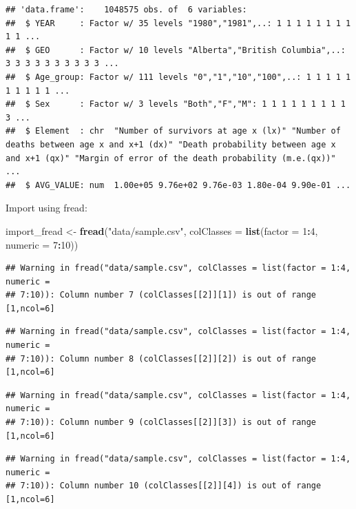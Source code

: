 \documentclass[]{book}
\newenvironment{Shaded}{\begin{snugshade}}{\end{snugshade}}
\newcommand{\DataTypeTok}[1]{\textcolor[rgb]{0.13,0.29,0.53}{#1}}
\newcommand{\DecValTok}[1]{\textcolor[rgb]{0.00,0.00,0.81}{#1}}
\newcommand{\KeywordTok}[1]{\textcolor[rgb]{0.13,0.29,0.53}{\textbf{#1}}}
\newcommand{\NormalTok}[1]{#1}
\newcommand{\OperatorTok}[1]{\textcolor[rgb]{0.81,0.36,0.00}{\textbf{#1}}}
\newcommand{\StringTok}[1]{\textcolor[rgb]{0.31,0.60,0.02}{#1}}
\begin{document}
\begin{verbatim}
## 'data.frame':	1048575 obs. of  6 variables:
##  $ YEAR     : Factor w/ 35 levels "1980","1981",..: 1 1 1 1 1 1 1 1 1 1 ...
##  $ GEO      : Factor w/ 10 levels "Alberta","British Columbia",..: 3 3 3 3 3 3 3 3 3 3 ...
##  $ Age_group: Factor w/ 111 levels "0","1","10","100",..: 1 1 1 1 1 1 1 1 1 1 ...
##  $ Sex      : Factor w/ 3 levels "Both","F","M": 1 1 1 1 1 1 1 1 1 3 ...
##  $ Element  : chr  "Number of survivors at age x (lx)" "Number of deaths between age x and x+1 (dx)" "Death probability between age x and x+1 (qx)" "Margin of error of the death probability (m.e.(qx))" ...
##  $ AVG_VALUE: num  1.00e+05 9.76e+02 9.76e-03 1.80e-04 9.90e-01 ...
\end{verbatim}

Import using fread:

\begin{Shaded}
\begin{Highlighting}[]
\NormalTok{import_fread <-}\StringTok{ }\KeywordTok{fread}\NormalTok{(}\StringTok{"data/sample.csv"}\NormalTok{, }
                      \DataTypeTok{colClasses =} \KeywordTok{list}\NormalTok{(}\DataTypeTok{factor =} \DecValTok{1}\OperatorTok{:}\DecValTok{4}\NormalTok{, }\DataTypeTok{numeric =} \DecValTok{7}\OperatorTok{:}\DecValTok{10}\NormalTok{))}
\end{Highlighting}
\end{Shaded}

\begin{verbatim}
## Warning in fread("data/sample.csv", colClasses = list(factor = 1:4, numeric =
## 7:10)): Column number 7 (colClasses[[2]][1]) is out of range [1,ncol=6]
\end{verbatim}

\begin{verbatim}
## Warning in fread("data/sample.csv", colClasses = list(factor = 1:4, numeric =
## 7:10)): Column number 8 (colClasses[[2]][2]) is out of range [1,ncol=6]
\end{verbatim}

\begin{verbatim}
## Warning in fread("data/sample.csv", colClasses = list(factor = 1:4, numeric =
## 7:10)): Column number 9 (colClasses[[2]][3]) is out of range [1,ncol=6]
\end{verbatim}

\begin{verbatim}
## Warning in fread("data/sample.csv", colClasses = list(factor = 1:4, numeric =
## 7:10)): Column number 10 (colClasses[[2]][4]) is out of range [1,ncol=6]
\end{verbatim}
\end{document}
